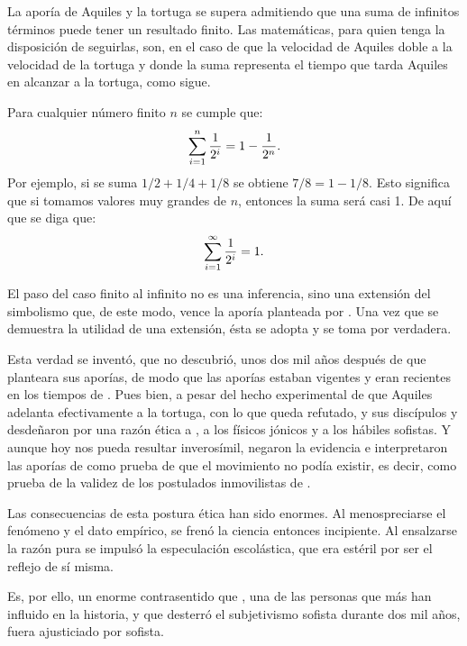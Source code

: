 \goodpage

La aporía de Aquiles y la tortuga se supera admitiendo que una suma de
infinitos términos puede tener un resultado finito. Las matemáticas, para
quien tenga la disposición de seguirlas, son, en el caso de que la velocidad
de Aquiles doble a la velocidad de la tortuga y donde la suma representa el
tiempo que tarda Aquiles en alcanzar a la tortuga, como sigue.

Para cualquier número finito $n$ se cumple que:
$$\sum_{i=1}^n {1 \over 2^i} = 1 - {1 \over 2^n} .$$
Por ejemplo, si se suma $1/2 + 1/4 + 1/8$ se obtiene $7/8 = 1 - 1/8$. Esto
significa que si tomamos valores muy grandes de $n$, entonces la suma será
casi 1. De aquí que se diga que:
$$\sum_{i=1}^{\infty} {1 \over 2^i} = 1 .$$

El paso del caso finito al infinito no es una inferencia, sino una extensión
del simbolismo que, de este modo, vence la aporía planteada por
. Una vez que se demuestra la utilidad de una extensión, ésta
se adopta y se toma por verdadera.

\goodpage

Esta verdad se inventó, que no descubrió, unos dos mil años después de que
 planteara sus aporías, de modo que las aporías estaban
vigentes y eran recientes en los tiempos de . Pues bien, a
pesar del hecho experimental de que Aquiles adelanta efectivamente a la
tortuga, con lo que  queda refutado,  y
sus discípulos  y  desdeñaron por una
razón ética a , a los físicos jónicos y a los hábiles
sofistas. Y aunque hoy nos pueda resultar inverosímil, negaron la evidencia
e interpretaron las aporías de  como prueba de que el
movimiento no podía existir, es decir, como prueba de la validez de los
postulados inmovilistas de .

Las consecuencias de esta postura ética han sido enormes. Al menospreciarse
el fenómeno y el dato empírico, se frenó la ciencia entonces incipiente. Al
ensalzarse la razón pura se impulsó la especulación escolástica, que era
estéril por ser el reflejo de sí misma.

Es, por ello, un enorme contrasentido que , una de las
personas que más han influido en la historia, y que desterró el subjetivismo
sofista durante dos mil años, fuera ajusticiado por sofista\cite{Tovar1984}.


\endinput
